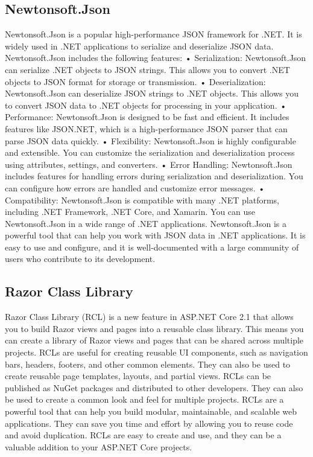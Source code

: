 \subsection{Newtonsoft.Json}
Newtonsoft.Json is a popular high-performance JSON framework for .NET. It is widely used in .NET applications to serialize and deserialize JSON data.
Newtonsoft.Json includes the following features:
•	Serialization: Newtonsoft.Json can serialize .NET objects to JSON strings. This allows you to convert .NET objects to JSON format for storage or transmission.
•	Deserialization: Newtonsoft.Json can deserialize JSON strings to .NET objects. This allows you to convert JSON data to .NET objects for processing in your application.
•	Performance: Newtonsoft.Json is designed to be fast and efficient. It includes features like JSON.NET, which is a high-performance JSON parser that can parse JSON data quickly.
•	Flexibility: Newtonsoft.Json is highly configurable and extensible. You can customize the serialization and deserialization process using attributes, settings, and converters.
•	Error Handling: Newtonsoft.Json includes features for handling errors during serialization and deserialization. You can configure how errors are handled and customize error messages.
•	Compatibility: Newtonsoft.Json is compatible with many .NET platforms, including .NET Framework, .NET Core, and Xamarin. You can use Newtonsoft.Json in a wide range of .NET applications.
Newtonsoft.Json is a powerful tool that can help you work with JSON data in .NET applications. It is easy to use and configure, and it is well-documented with a large community of users who contribute to its development.

\subsection{Razor Class Library}
Razor Class Library (RCL) is a new feature in ASP.NET Core 2.1 that allows you to build Razor views and pages into a reusable class library. This means you can create a library of Razor views and pages that can be shared across multiple projects. 
RCLs are useful for creating reusable UI components, such as navigation bars, headers, footers, and other common elements. 
They can also be used to create reusable page templates, layouts, and partial views. RCLs can be published as NuGet packages and distributed to other developers. 
They can also be used to create a common look and feel for multiple projects. RCLs are a powerful tool that can help you build modular, maintainable, and scalable web applications. 
They can save you time and effort by allowing you to reuse code and avoid duplication. RCLs are easy to create and use, and they can be a valuable addition to your ASP.NET Core projects.